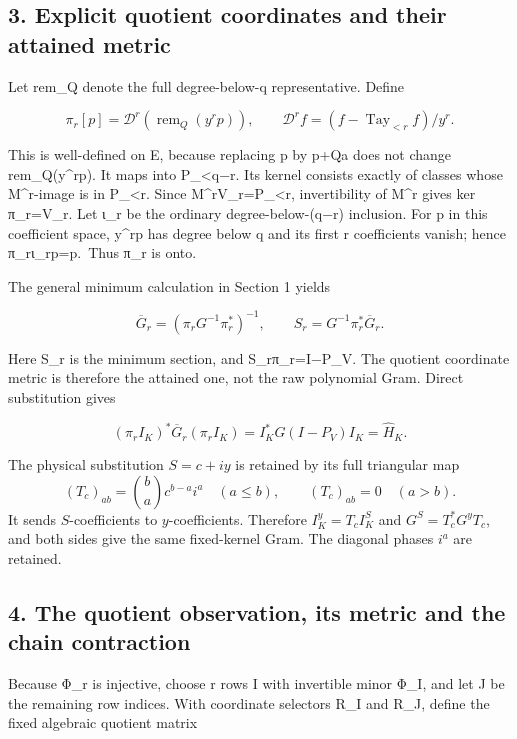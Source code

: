 \documentclass[11pt]{article}
\begin{document}
\subsection{3. Explicit quotient coordinates and their attained metric}\label{explicit-quotient-coordinates-and-their-attained-metric}

Let rem\_Q denote the full degree-below-q representative. Define

\[
\pi_r[p]=\mathscr D^r(\operatorname{rem}_Q(y^rp)),\qquad
\mathscr D^rf=(f-\operatorname{Tay}_{<r}f)/y^r.
\tag{F10}
\]

This is well-defined on E, because replacing p by p+Qa does not change rem\_Q(y\^{}rp). It maps into P\_\textless q−r. Its kernel consists exactly of classes whose M\^{}r-image is in P\_\textless r. Since M\^{}rV\_r=P\_\textless r, invertibility of M\^{}r gives ker π\_r=V\_r. Let ι\_r be the ordinary degree-below-(q−r) inclusion. For p in this coefficient space, y\^{}rp has degree below q and its first r coefficients vanish; hence π\_rι\_rp=p.~Thus π\_r is onto.

The general minimum calculation in Section 1 yields

\[
\overline G_r=(\pi_rG^{-1}\pi_r^*)^{-1},\qquad
S_r=G^{-1}\pi_r^*\overline G_r. \tag{F11}
\]

Here S\_r is the minimum section, and S\_rπ\_r=I−P\_V. The quotient coordinate metric is therefore the attained one, not the raw polynomial Gram. Direct substitution gives

\[
(\pi_rI_K)^*\overline G_r(\pi_rI_K)
=I_K^*G(I-P_V)I_K=\widehat H_K.
\]

The physical substitution \(S=c+iy\) is retained by its full triangular map \[
(T_c)_{ab}=\binom ba c^{b-a}i^a\quad(a\le b),\qquad (T_c)_{ab}=0\quad(a>b).
\] It sends \(S\)-coefficients to \(y\)-coefficients. Therefore \(I_K^y=T_cI_K^S\) and \(G^S=T_c^*G^yT_c\), and both sides give the same fixed-kernel Gram. The diagonal phases \(i^a\) are retained.

\subsection{4. The quotient observation, its metric and the chain contraction}\label{the-quotient-observation-its-metric-and-the-chain-contraction}

Because Φ\_r is injective, choose r rows I with invertible minor Φ\_I, and let J be the remaining row indices. With coordinate selectors R\_I and R\_J, define the fixed algebraic quotient matrix
\end{document}
